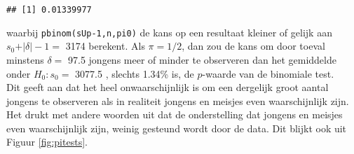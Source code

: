\documentclass[12pt,dutch,coursenotes]{book}
\theoremstyle{definition}
\theoremstyle{definition}
\theoremstyle{definition}
\theoremstyle{remark}
\begin{document}
\begin{verbatim}
## [1] 0.01339977
\end{verbatim}

waarbij \texttt{pbinom(sUp-1,n,pi0)} de kans op een resultaat kleiner of
gelijk aan \(s_0+\vert \delta\vert -1 =\) 3174 berekent. Als
\(\pi= 1/2\), dan zou de kans om door toeval minstens \(\delta=\) 97.5
jongens meer of minder te observeren dan het gemiddelde onder
\(H_0: s_0=\) 3077.5 , slechts 1.34\% is, de \(p\)-waarde van de
binomiale test.\\
Dit geeft aan dat het heel onwaarschijnlijk is om een dergelijk groot
aantal jongens te observeren als in realiteit jongens en meisjes even
waarschijnlijk zijn. Het drukt met andere woorden uit dat de
onderstelling dat jongens en meisjes even waarschijnlijk zijn, weinig
gesteund wordt door de data. Dit blijkt ook uit Figuur
\ref{fig:pitests}.
\end{document}
